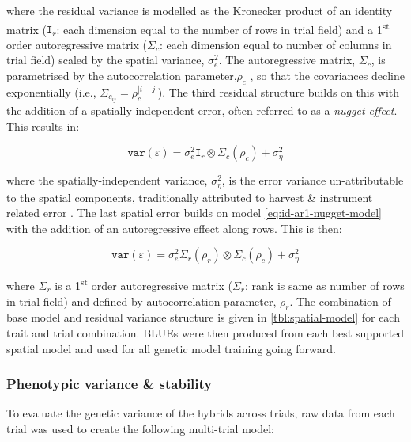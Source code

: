 where the residual variance is modelled as the Kronecker product of an identity matrix (\(\mathtt I_r\): each dimension equal to the number of rows in trial field) and a 1\textsuperscript{st} order autoregressive matrix (\(\mathtt \Sigma_c\): each dimension equal to number of columns in trial field) scaled by the spatial variance, \(\sigma^2_e\). The autoregressive matrix, \(\Sigma_c\), is parametrised by the autocorrelation parameter,\(\rho_c\) , so that the covariances decline exponentially (i.e., \(\Sigma_{c_{ij}} = \rho_c^{|i - j|}\)). The third residual structure builds on this with the addition of a spatially-independent error, often referred to as a \emph{nugget effect}. This results in:

\begin{equation}
\mathtt{var}(\varepsilon) = \sigma^2_e \mathtt I_r\otimes\Sigma_c(\rho_c) + \sigma^2_{\eta} \label{eq:id-ar1-nugget-model}
\end{equation}

where the spatially-independent variance, \(\sigma^2_{\eta}\), is the error variance un-attributable to the spatial components, traditionally attributed to harvest \& instrument related error \cite{Muller2010}. The last spatial error builds on model \eqref{eq:id-ar1-nugget-model} with the addition of an autoregressive effect along rows. This is then:

\begin{equation}
\mathtt{var}(\varepsilon) = \sigma^2_e\Sigma_r(\rho_r)\otimes\Sigma_c(\rho_c) + \sigma^2_{\eta}   
\label{eq:ar1-ar1-nugget-model}
\end{equation}

where \(\Sigma_r\) is a 1\textsuperscript{st} order autoregressive matrix (\(\mathtt \Sigma_r\): rank is same as number of rows in trial field) and defined by autocorrelation parameter, \(\rho_r\). The combination of base model and residual variance structure is given in \ref{tbl:spatial-model} for each trait and trial combination. BLUEs were then produced from each best supported spatial model and used for all genetic model training going forward.

\subsubsection{Phenotypic variance \& stability}

To evaluate the genetic variance of the hybrids across trials, raw data from each trial was used to create the following multi-trial model:

